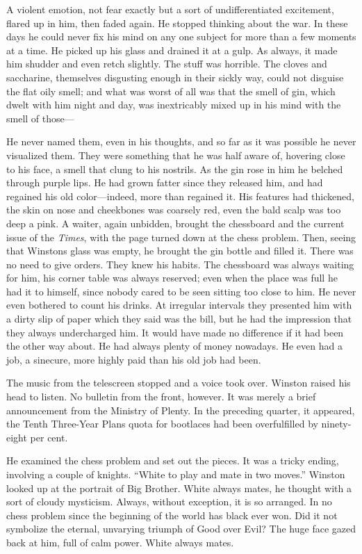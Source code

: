 A violent emotion, not fear exactly but a sort of undifferentiated
excitement, flared up in him, then faded again. He stopped thinking
about the war. In these days he could never fix his mind on any one
subject for more than a few moments at a time. He picked up his glass
and drained it at a gulp. As always, it made him shudder and even retch
slightly. The stuff was horrible. The cloves and saccharine, themselves
disgusting enough in their sickly way, could not disguise the flat oily
smell; and what was worst of all was that the smell of gin, which dwelt
with him night and day, was inextricably mixed up in his mind with the
smell of those---

He never named them, even in his thoughts, and so far as it was possible
he never visualized them. They were something that he was half aware of,
hovering close to his face, a smell that clung to his nostrils. As the
gin rose in him he belched through purple lips. He had grown fatter
since they released him, and had regained his old color---indeed, more
than regained it. His features had thickened, the skin on nose and
cheekbones was coarsely red, even the bald scalp was too deep a pink. A
waiter, again unbidden, brought the chessboard and the current issue of
the \emph{Times}, with the page turned down at the chess problem. Then,
seeing that Winston\textquotesingle s glass was empty, he brought the
gin bottle and filled it. There was no need to give orders. They knew
his habits. The chessboard was always waiting for him, his corner table
was always reserved; even when the place was full he had it to himself,
since nobody cared to be seen sitting too close to him. He never even
bothered to count his drinks. At irregular intervals they presented him
with a dirty slip of paper which they said was the bill, but he had the
impression that they always undercharged him. It would have made no
difference if it had been the other way about. He had always plenty of
money nowadays. He even had a job, a sinecure, more highly paid than his
old job had been.

The music from the telescreen stopped and a voice took over. Winston
raised his head to listen. No bulletin from the front, however. It was
merely a brief announcement from the Ministry of Plenty. In the
preceding quarter, it appeared, the Tenth Three-Year
Plan\textquotesingle s quota for bootlaces had been overfulfilled by
ninety-eight per cent.

He examined the chess problem and set out the pieces. It was a tricky
ending, involving a couple of knights. ``White to play and mate in two
moves.'' Winston looked up at the portrait of Big Brother. White always
mates, he thought with a sort of cloudy mysticism. Always, without
exception, it is so arranged. In no chess problem since the beginning of
the world has black ever won. Did it not symbolize the eternal,
unvarying triumph of Good over Evil? The huge face gazed back at him,
full of calm power. White always mates.

